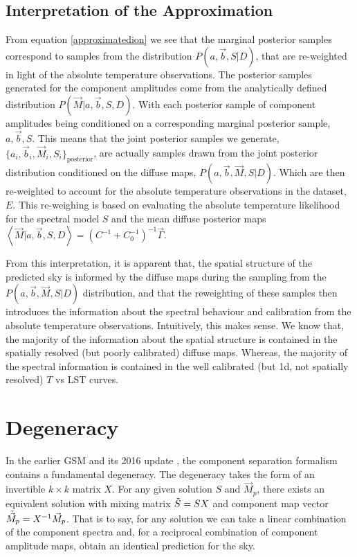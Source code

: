 \documentclass[fleqn,usenatbib]{mnras}
\begin{document}
\subsection{Interpretation of the Approximation}
From equation \ref{approximatedion} we see that the marginal posterior samples correspond to samples from the distribution $P(a,\Vec{b},S|D)$, that are re-weighted in light of the absolute temperature observations. The posterior samples generated for the component amplitudes come from the analytically defined distribution $P(\Vec{M}|a,\Vec{b},S,D)$. With each posterior sample of component amplitudes being conditioned on a corresponding marginal posterior sample, $a,\Vec{b},S$. This means that the joint posterior samples we generate, $\{a_i,\Vec{b}_i,\Vec{M}_i,S_i\}_\mathrm{posterior}$, are actually samples drawn from the joint posterior distribution conditioned on the diffuse maps, $P(a,\Vec{b},\vec{M},S|D)$. Which are then re-weighted to account for the absolute temperature observations in the dataset, $E$. This re-weighing is based on evaluating the absolute temperature likelihood for the spectral model $S$ and the mean diffuse posterior maps $\left<\Vec{M}|a,\Vec{b},S,D\right> = \left(C^{-1}+C_0^{-1}\right)^{-1}\Vec{\Gamma}$.

From this interpretation, it is apparent that, the spatial structure of the predicted sky is informed by the diffuse maps during the sampling from the $P(a,\Vec{b},\Vec{M},S|D)$ distribution, and that the reweighting of these samples then introduces the information about the spectral behaviour and calibration from the absolute temperature observations. Intuitively, this makes sense. We know that, the majority of the information about the spatial structure is contained in the spatially resolved (but poorly calibrated) diffuse maps. Whereas, the majority of the spectral information is contained in the well calibrated (but 1d, not spatially resolved) $T$ vs LST curves. 


\section{Degeneracy}
In the earlier GSM \citep{GSM} and its 2016 update \citep{Zheng2016}, the component separation formalism contains a fundamental degeneracy. The degeneracy takes the form of an invertible $k\times k$ matrix $X$. For any given solution $S$ and $\Vec{M}_p$, there exists an equivalent solution with mixing matrix $\Tilde{S}=SX$ and component map vector $\Tilde{\Vec{M}}_p=X^{-1}\Vec{M}_p$. That is to say, for any solution we can take a linear combination of the component spectra and, for a reciprocal combination of component amplitude maps, obtain an identical prediction for the sky.
\end{document}
